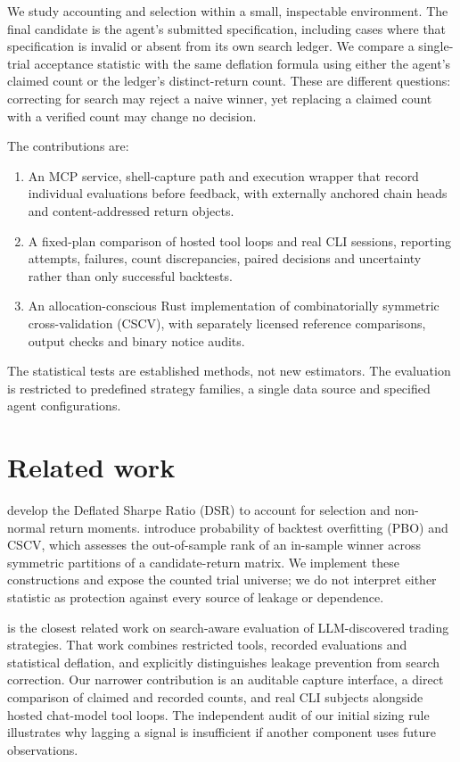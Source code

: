 \documentclass[11pt]{article}
\begin{document}
We study accounting and selection within a small, inspectable environment.
The final candidate is the agent's submitted specification, including cases
where that specification is invalid or absent from its own search ledger.
We compare a single-trial acceptance statistic with the same deflation formula
using either the agent's claimed count or the ledger's distinct-return count.
These are different questions: correcting for search may reject a naive winner,
yet replacing a claimed count with a verified count may change no decision.

The contributions are:
\begin{enumerate}
\item An MCP service, shell-capture path and execution wrapper that record
individual evaluations before feedback, with externally anchored chain heads
and content-addressed return objects.
\item A fixed-plan comparison of hosted tool loops and real CLI sessions,
reporting attempts, failures, count discrepancies, paired decisions and
uncertainty rather than only successful backtests.
\item An allocation-conscious Rust implementation of combinatorially symmetric
cross-validation (CSCV), with separately licensed reference comparisons,
output checks and binary notice audits.
\end{enumerate}
The statistical tests are established methods, not new estimators. The evaluation
is restricted to predefined strategy families, a single data source and specified
agent configurations.

\section{Related work}
\citet{dsr} develop the Deflated Sharpe Ratio (DSR) to account for selection and
non-normal return moments. \citet{pbo} introduce probability of backtest
overfitting (PBO) and CSCV, which assesses the out-of-sample rank of an
in-sample winner across symmetric partitions of a candidate-return matrix.
We implement these constructions and expose the counted trial universe;
we do not interpret either statistic as protection against every source of
leakage or dependence.

\citet{gencay} is the closest related work on search-aware evaluation of
LLM-discovered trading strategies. That work combines restricted tools,
recorded evaluations and statistical deflation, and explicitly distinguishes
leakage prevention from search correction. Our narrower contribution is an
auditable capture interface, a direct comparison of claimed and recorded
counts, and real CLI subjects alongside hosted chat-model tool loops.
The independent audit of our initial sizing rule illustrates why lagging a
signal is insufficient if another component uses future observations.
\end{document}
